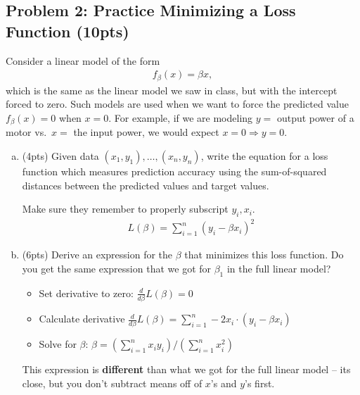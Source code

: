 \documentclass[10pt]{article}
\begin{document}
\newpage
\subsection{Problem 2: Practice Minimizing a Loss Function (10pts)}
Consider a linear model of the form
\begin{align*}
f_{\beta}(x) = \beta x,
\end{align*}
which is the same as the linear model we saw in class, but with the intercept forced to zero.  Such models are used when we want to force the predicted value $f_{\beta}(x)=0$ when
$x=0$.  For example, if we are modeling $y=$ output power of a motor
vs.\ $x=$ the input power, we would expect $x=0 \Rightarrow y=0$.
\begin{enumerate}[(a)]
	\item (4pts) Given data $(x_1,y_1), \ldots, (x_n,y_n)$,
	write the equation for a loss function which measures prediction accuracy using the sum-of-squared distances between the predicted values and target values. 
	
	Make sure they remember to properly subscript $y_i, x_i$.
	\begin{align*}
	L(\beta) = \sum_{i=1}^n (y_i - \beta x_i)^2
	\end{align*}
	
	\item (6pts) Derive an expression for the $\beta$ that minimizes this loss function. Do you get the same expression that we got for $\beta_1$ in the full linear model? 
	
	\begin{itemize}
		\item Set derivative to zero: $\frac{d}{d\beta} L(\beta) = 0$
		\item Calculate derivative $\frac{d}{d\beta} L(\beta) = \sum_{i=1}^n -2x_i\cdot(y_i - \beta x_i)$
		\item Solve for $\beta$: $\beta = (\sum_{i=1}^n x_iy_i)/ (\sum_{i=1}^n x_i^2)$
	\end{itemize}
This expression is \textbf{different} than what we got for the full linear model -- its close, but you don't subtract means off of $x$'s and $y$'s first. 
\end{enumerate}

\newpage
\end{document}
